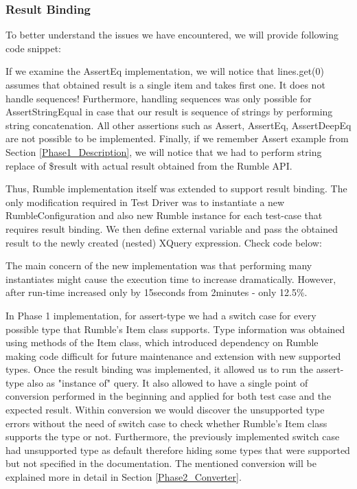 \subsubsection{Result Binding}
To better understand the issues we have encountered, we will provide following code snippet:



If we examine the AssertEq implementation, we will notice that lines.get(0) assumes that obtained result is a single item and takes first one. It does not handle sequences! Furthermore, handling sequences was only possible for AssertStringEqual in case that our result is sequence of strings by performing string concatenation. All other assertions such as Assert, AssertEq, AssertDeepEq are not possible to be implemented. Finally, if we remember Assert example from Section \ref{Phase1_Description}, we will notice that we had to perform string replace of \$result with actual result obtained from the Rumble API. 

Thus, Rumble implementation itself was extended to support result binding. The only modification required in Test Driver was to instantiate a new RumbleConfiguration and also new Rumble instance for each test-case that requires result binding. We then define external variable and pass the obtained result to the newly created (nested) XQuery expression. Check code below:



The main concern of the new implementation was that performing many instantiates might cause the execution time to increase dramatically. However, after run-time increased only by 15seconds from 2minutes - only 12.5\%.

In Phase 1 implementation, for assert-type we had a switch case for every possible type that Rumble's Item class supports. Type information was obtained using methods of the Item class, which introduced dependency on Rumble making code difficult for future maintenance and extension with new supported types. Once the result binding was implemented, it allowed us to run the assert-type also as "instance of" query. It also allowed to have a single point of conversion performed in the beginning and applied for both test case and the expected result. Within conversion we would discover the unsupported type errors without the need of switch case to check whether Rumble's Item class supports the type or not. Furthermore, the previously implemented switch case had unsupported type as default therefore hiding some types that were supported but not specified in the documentation. The mentioned conversion will be explained more in detail in Section \ref{Phase2_Converter}. 


